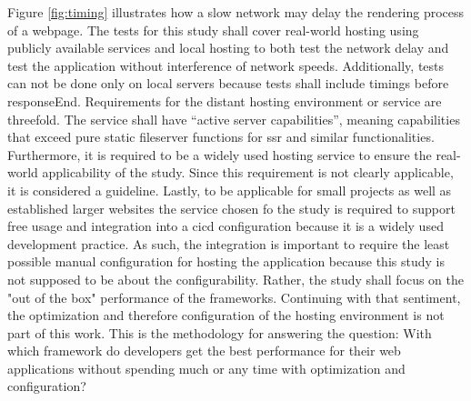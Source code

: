 \documentclass[a4paper, 12pt]{article}
\begin{document}
Figure \ref{fig:timing} illustrates how a slow network may delay the rendering process of a webpage.
The tests for this study shall cover real-world hosting using publicly available services and local hosting to both test the network delay and test the application without interference of network speeds.
Additionally, tests can not be done only on local servers because tests shall include timings before responseEnd.
Requirements for the distant hosting environment or service are threefold.
The service shall have \enquote{active server capabilities}, meaning capabilities that exceed pure static fileserver functions for \acrlong{ssr} and similar functionalities.
Furthermore, it is required to be a widely used hosting service to ensure the real-world applicability of the study.
Since this requirement is not clearly applicable, it is considered a guideline.
Lastly, to be applicable for small projects as well as established larger websites the service chosen fo the study is required to support free usage and integration into a \acrfull{cicd} configuration because it is a widely used development practice. %
As such, the integration is important to require the least possible manual configuration for hosting the application because this study is not supposed to be about the configurability.
Rather, the study shall focus on the "out of the box" performance of the frameworks.
Continuing with that sentiment, the optimization and therefore configuration of the hosting environment is not part of this work.
This is the methodology for answering the question: With which framework do developers get the best performance for their web applications without spending much or any time with optimization and configuration?

\end{document}
